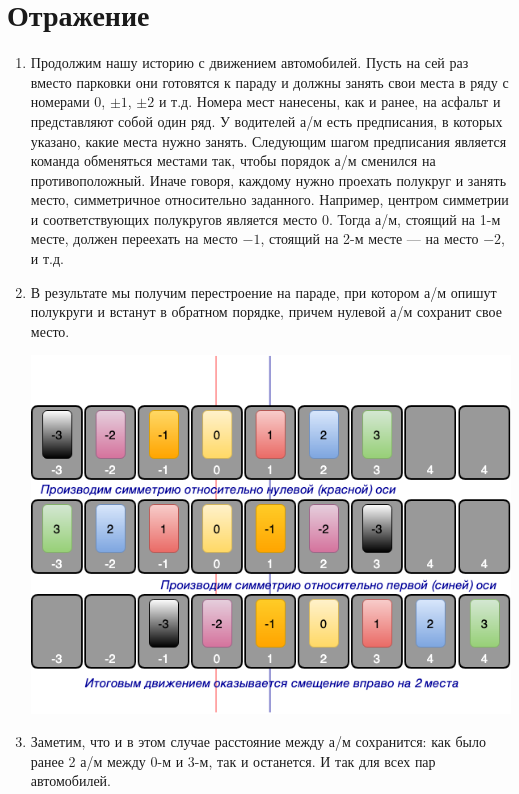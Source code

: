 \section{Отражение}



\begin{enumerate}
\item Продолжим нашу историю с движением автомобилей. Пусть на сей раз вместо парковки они готовятся к параду и должны занять свои места в ряду с номерами 0, $\pm 1$, $\pm 2$ и т.д. Номера мест нанесены, как и ранее, на асфальт и представляют собой один ряд. У водителей а/м есть предписания, в которых указано, какие места нужно занять. Следующим шагом предписания является команда обменяться местами так, чтобы порядок а/м сменился на противоположный. Иначе говоря, каждому нужно проехать полукруг и занять место, симметричное относительно заданного. Например, центром симметрии и соответствующих полукругов является место 0. Тогда а/м, стоящий на 1-м месте, должен переехать на место $-1$, стоящий на 2-м месте --- на место $-2$, и т.д.
\item В результате мы получим перестроение на параде, при котором а/м опишут полукруги и встанут в обратном порядке, причем нулевой а/м сохранит свое место.
\begin{center}
\includegraphics[scale=0.6]{SST.png}
\end{center}
\item Заметим, что и в этом случае расстояние между а/м сохранится: как было ранее 2 а/м между 0-м и 3-м, так и останется. И так для всех пар автомобилей.

\end{enumerate}

